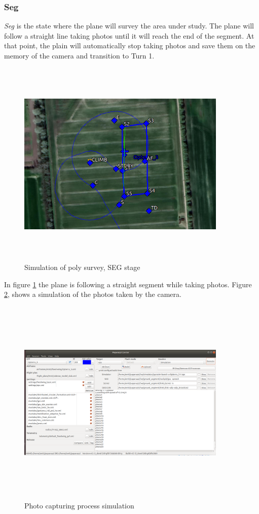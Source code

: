 \subsubsection{Seg}
\textit{Seg} is the state where the plane will survey the area under study. The plane will follow a straight line taking photos until it will reach the end of the segment. At that point, the plain will automatically stop taking photos and save them on the memory of the camera and transition to Turn 1.
\begin{figure}[H]
\centering
\includegraphics[width=10cm,height=10cm,keepaspectratio]{imagenes/SEG.png}
\caption{Simulation of poly survey, SEG stage}
\label{fig:SEG_stage}
\end{figure}

In figure \ref{fig:SEG_stage} the plane is following a straight segment while taking photos. Figure \ref{fig:Photos}, shows a simulation of the photos taken by the camera.
\begin{figure}[H]
\centering
\includegraphics[width=10cm,height=10cm,keepaspectratio]{imagenes/Photos.png}
\caption{Photo capturing process simulation}
\label{fig:Photos}
\end{figure}

